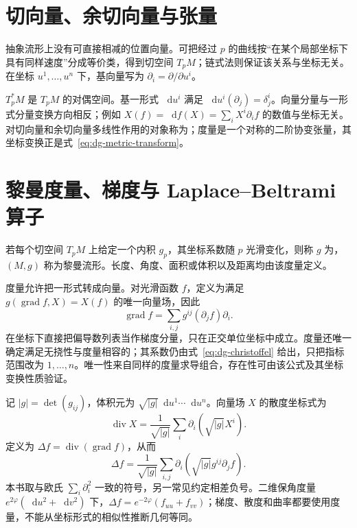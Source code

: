 \documentclass[UTF8,12pt,a4paper,fontset=fandol]{ctexbook}
\newcommand{\dd}{\mathop{}\!\mathrm d}
\DeclareMathOperator{\grad}{grad}
\begin{document}
\section{切向量、余切向量与张量}
抽象流形上没有可直接相减的位置向量。可把经过 $p$ 的曲线按“在某个局部坐标下具有同样速度”分成等价类，得到切空间 $T_pM$；链式法则保证该关系与坐标无关。在坐标 $u^1,\ldots,u^n$ 下，基向量写为 $\partial_i=\partial/\partial u^i$。

 $T_p^*M$ 是 $T_pM$ 的对偶空间。基一形式 $\dd u^i$ 满足 $\dd u^i(\partial_j)=\delta^i_j$。向量分量与一形式分量变换方向相反；例如 $X(f)=\dd f(X)=\sum_iX^i\partial_i f$ 的数值与坐标无关。对切向量和余切向量多线性作用的对象称为；度量是一个对称的二阶协变张量，其坐标变换正是式~\eqref{eq:dg-metric-transform}。

\section{黎曼度量、梯度与 Laplace--Beltrami 算子}
\begin{definition}[黎曼度量]
若每个切空间 $T_pM$ 上给定一个内积 $g_p$，其坐标系数随 $p$ 光滑变化，则称 $g$ 为，$(M,g)$ 称为黎曼流形。长度、角度、面积或体积以及距离均由该度量定义。
\end{definition}
度量允许把一形式转成向量。对光滑函数 $f$，定义为满足 $g(\grad f,X)=X(f)$ 的唯一向量场，因此
\[
 \grad f=\sum_{i,j}g^{ij}(\partial_jf)\partial_i.
\]
在坐标下直接把偏导数列表当作梯度分量，只在正交单位坐标中成立。度量还唯一确定满足无挠性与度量相容的；其系数仍由式~\eqref{eq:dg-christoffel} 给出，只把指标范围改为 $1,\ldots,n$。唯一性来自同样的度量求导组合，存在性可由该公式及其坐标变换性质验证。

记 $|g|=\det(g_{ij})$，体积元为 $\sqrt{|g|}\dd u^1\cdots\dd u^n$。向量场 $X$ 的散度坐标式为
\[
 \operatorname{div}X=\frac1{\sqrt{|g|}}\sum_i\partial_i(\sqrt{|g|}X^i).
\]
定义为 $\Delta f=\operatorname{div}(\grad f)$，从而
\begin{equation}
 \Delta f=\frac1{\sqrt{|g|}}\sum_{i,j}
 \partial_i\left(\sqrt{|g|}g^{ij}\partial_jf\right).
 \label{eq:dg-laplacian}
\end{equation}
本书取与欧氏 $\sum_i\partial_i^2$ 一致的符号，另一常见约定相差负号。二维保角度量 $e^{2\varphi}(\dd u^2+\dd v^2)$ 下，$\Delta f=e^{-2\varphi}(f_{uu}+f_{vv})$；梯度、散度和曲率都要使用度量，不能从坐标形式的相似性推断几何等同。
\end{document}
